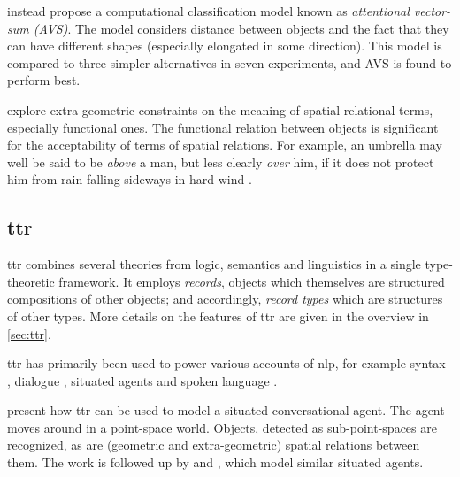 \cite{RegierGroundingspatiallanguage2001a} instead propose a computational classification model known as \textit{attentional vector-sum (AVS)}.
The model considers distance between objects and the fact that they can have different shapes (especially elongated in some direction).
This model is compared to three simpler alternatives in seven experiments, and AVS is found to perform best.

\cite{CoventryInterplayGeometryFunction2001} explore extra-geometric constraints on the meaning of spatial relational terms, especially functional ones.
The functional relation between objects is significant for the acceptability of terms of spatial relations.
For example, an umbrella may well be said to be \textit{above} a man, but less clearly \textit{over} him, if it does not protect him from rain falling sideways in hard wind \citep{CoventryInterplayGeometryFunction2001}.




\subsection{\Gls{ttr}}
\label{sec:ttnlp}


\Gls{ttr} \citep{CooperRecordsRecordTypes2005} combines several theories from logic, semantics and linguistics in a single type-theoretic framework.
It employs \textit{records}, objects which themselves are structured compositions of other objects;
and accordingly, \textit{record types} which are structures of other types.
More details on the features of \gls{ttr} are given in the overview in \autoref{sec:ttr}.

\gls{ttr} has primarily been used to power various accounts of \gls{nlp}, for example
syntax \citep{CooperAustiniantruthattitudes2005, CooperRecordsRecordTypes2005, CooperTypetheorysemantics2012, CooperTypetheorylanguage2016},
dialogue \citep{Larssonformalviewcorrective2009, LarssonDialoguesHaveContent2011, CooperTypetheorylanguage2016},
situated agents \citep{DobnikModellinglanguageaction2012, ttrspat,lspc} and
spoken language \citep{CooperTypetheorylanguage2016}.


\cite{DobnikModellinglanguageaction2012} present how \gls{ttr} can be used to model a situated conversational agent.
The agent moves around in a point-space world.
Objects, detected as sub-point-spaces are recognized, as are (geometric and extra-geometric) spatial relations between them.
The work is followed up by \cite{ttrspat} and \cite{lspc}, which model similar situated agents.

